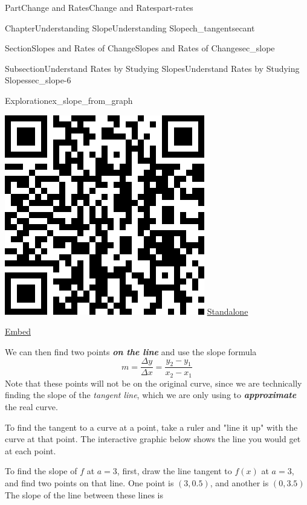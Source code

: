 \documentclass[oneside,10pt,]{tufte-book}
\newcommand{\alert}[1]{\textbf{\textit{#1}}}
\numberwithin{equation}{chapter}
\begin{document}
\begin{partptx}{Part}{Change and Rates}{}{Change and Rates}{}{}{part-rates}
\begin{chapterptx}{Chapter}{Understanding Slope}{}{Understanding Slope}{}{}{ch_tangentsecant}
\begin{sectionptx}{Section}{Slopes and Rates of Change}{}{Slopes and Rates of Change}{}{}{sec_slope}
\begin{subsectionptx}{Subsection}{Understand Rates by Studying Slopes}{}{Understand Rates by Studying Slopes}{}{}{sec_slope-6}
\begin{exploration}{Exploration}{}{ex_slope_from_graph}
\begin{enumerate}[font=\bfseries,label=(\alph*),ref=\alph*]
\begin{sidebyside}{2}{0.075}{0.075}{0.17}
\begin{sbspanel}{0.21}
\includegraphics[width=\linewidth]{generated/qrcode/ex_slope_from_graph-4-2-2.png}
\href{http://webwork.bridgew.edu/oer/functions_at_work/ex_slope_from_graph-4-2-2.html}{Standalone}%
\par
\href{http://webwork.bridgew.edu/oer/functions_at_work/ex_slope_from_graph-4-2-2-if.html}{Embed}%
\end{sbspanel}%
\end{sidebyside}%
\par
We can then find two points \alert{on the line} and use the slope formula%
\begin{equation*}
m = \dfrac{\Delta y}{\Delta x} = \dfrac{y_2-y_1}{x_2-x_1}
\end{equation*}
Note that these points will not be on the original curve, since we are technically finding the slope of the \emph{tangent line}, which we are only using to \alert{approximate} the real curve.%
\par
To find the tangent to a curve at a point, take a ruler and "line it up" with the curve at that point. The interactive graphic below shows the line you would get at each point.%
\par
To find the slope of \(f\) at \(a=3\), first, draw the line tangent to \(f(x)\) at \(a=3\), and find two points on that line. One point is \((3,0.5)\), and another is \((0,3.5)\) The slope of the line between these lines is%

\end{enumerate}
\end{exploration}
\end{subsectionptx}
\end{sectionptx}
\end{chapterptx}
\end{partptx}
\end{document}
